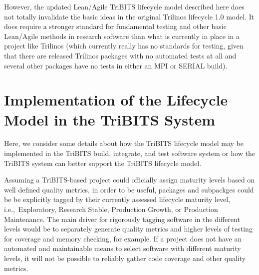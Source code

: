\documentclass[11pt]{SANDreport}
\begin{document}
However, the updated Lean/Agile TriBITS lifecycle model described here
does not totally invalidate the basic ideas in the original Trilinos
lifecycle 1.0 model. It does require a stronger standard for
fundamental testing and other basic Lean/Agile methods in research
software than what is currently in place in a project like Trilinos
(which currently really has no standards for testing, given that there
are released Trilinos packages with no automated tests at all and
several other packages have no tests in either an MPI or SERIAL
build).


%
\section{Implementation of the Lifecycle Model in the TriBITS System}
\label{sec:implementation_in_tribits}
%

Here, we consider some details about how the TriBITS lifecycle model
may be implemented in the TriBITS build, integrate, and test
software system or how the TriBITS system can better support the
TriBITS lifecycle model.

Assuming a TriBITS-based project could officially assign maturity
levels based on well defined quality metrics, in order to be useful,
packages and subpackges could be be explicitly tagged by their
currently assessed lifecycle maturity level, i.e.,\ Exploratory,
Research Stable, Production Growth, or Production Maintenance.  The
main driver for rigorously tagging software in the different levels
would be to separately generate quality metrics and higher levels of
testing for coverage and memory checking, for example.  If a project
does not have an automated and maintainable means to select software
with different maturity levels, it will not be possible to reliably
gather code coverage and other quality metrics.
\end{document}
